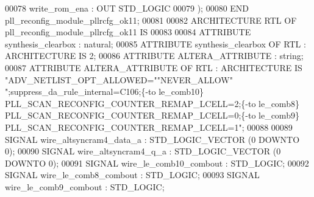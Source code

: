 \begin{DoxyCode}
{00078          \textcolor{vhdlchar}{write_rom_ena}  \textcolor{vhdlchar}{:}   \textcolor{keywordflow}{OUT}  \textcolor{comment}{STD\_LOGIC}
00079      \textcolor{vhdlchar}{)}; 
00080  \textcolor{keywordflow}{END} \textcolor{vhdlchar}{pll\_reconfig\_module\_pllrcfg\_ok11};
00081 
00082  \textcolor{keywordflow}{ARCHITECTURE} RTL \textcolor{keywordflow}{OF} pll_reconfig_module_pllrcfg_ok11 IS
00083 
00084      \textcolor{keywordflow}{ATTRIBUTE} \textcolor{vhdlchar}{synthesis_clearbox} \textcolor{vhdlchar}{:} \textcolor{comment}{natural};
00085      \textcolor{keywordflow}{ATTRIBUTE} \textcolor{vhdlchar}{synthesis_clearbox} \textcolor{keywordflow}{OF} \textcolor{vhdlchar}{RTL} \textcolor{vhdlchar}{:} \textcolor{keywordflow}{ARCHITECTURE} \textcolor{keywordflow}{IS} \textcolor{vhdllogic}{}\textcolor{vhdllogic}{2};
00086      \textcolor{keywordflow}{ATTRIBUTE} \textcolor{vhdlchar}{ALTERA_ATTRIBUTE} \textcolor{vhdlchar}{:} \textcolor{comment}{string};
00087      \textcolor{keywordflow}{ATTRIBUTE} \textcolor{vhdlchar}{ALTERA_ATTRIBUTE} \textcolor{keywordflow}{OF} \textcolor{vhdlchar}{RTL} \textcolor{vhdlchar}{:} \textcolor{keywordflow}{ARCHITECTURE} \textcolor{keywordflow}{IS} \textcolor{keyword}{"ADV\_NETLIST\_OPT\_ALLOWED="}\textcolor{keyword}{"NEVER\_ALLOW"}\textcolor{keyword}{
      ";suppress\_da\_rule\_internal=C106;\{-to le\_comb10\} PLL\_SCAN\_RECONFIG\_COUNTER\_REMAP\_LCELL=2;\{-to le\_comb8\}
       PLL\_SCAN\_RECONFIG\_COUNTER\_REMAP\_LCELL=0;\{-to le\_comb9\} PLL\_SCAN\_RECONFIG\_COUNTER\_REMAP\_LCELL=1"};
00088 
00089      \textcolor{keywordflow}{SIGNAL}  \textcolor{vhdlchar}{wire_altsyncram4_data_a}    \textcolor{vhdlchar}{:}   \textcolor{comment}{STD\_LOGIC\_VECTOR} \textcolor{vhdlchar}{(}\textcolor{vhdllogic}{}\textcolor{vhdllogic}{0} \textcolor{keywordflow}{DOWNTO} \textcolor{vhdllogic}{}\textcolor{vhdllogic}{0}\textcolor{vhdlchar}{)};
00090      \textcolor{keywordflow}{SIGNAL}  \textcolor{vhdlchar}{wire_altsyncram4_q_a}   \textcolor{vhdlchar}{:}   \textcolor{comment}{STD\_LOGIC\_VECTOR} \textcolor{vhdlchar}{(}\textcolor{vhdllogic}{}\textcolor{vhdllogic}{0} \textcolor{keywordflow}{DOWNTO} \textcolor{vhdllogic}{}\textcolor{vhdllogic}{0}\textcolor{vhdlchar}{)};
00091      \textcolor{keywordflow}{SIGNAL}  \textcolor{vhdlchar}{wire_le_comb10_combout} \textcolor{vhdlchar}{:}   \textcolor{comment}{STD\_LOGIC};
00092      \textcolor{keywordflow}{SIGNAL}  \textcolor{vhdlchar}{wire_le_comb8_combout}  \textcolor{vhdlchar}{:}   \textcolor{comment}{STD\_LOGIC};
00093      \textcolor{keywordflow}{SIGNAL}  \textcolor{vhdlchar}{wire_le_comb9_combout}  \textcolor{vhdlchar}{:}   \textcolor{comment}{STD\_LOGIC};
}
\end{DoxyCode}
